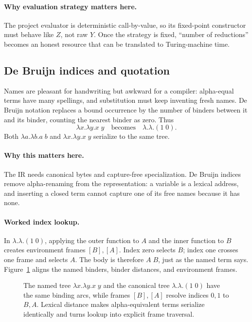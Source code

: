\paragraph{Why evaluation strategy matters here.}
The project evaluator is deterministic call-by-value, so its fixed-point
constructor must behave like \(Z\), not raw \(Y\).  Once the strategy is
fixed, ``number of reductions'' becomes an honest resource that can be
translated to Turing-machine time.

\subsection{De Bruijn indices and quotation}

Names are pleasant for handwriting but awkward for a compiler: alpha-equal
terms have many spellings, and substitution must keep inventing fresh names.
De Bruijn notation replaces a bound occurrence by the number of binders
between it and its binder, counting the nearest binder as zero.  Thus
\[
 \lambda x.\lambda y.x\;y
 \quad\text{becomes}\quad
 \lambda.\lambda.(1\;0).
\]
Both \(\lambda a.\lambda b.a\;b\) and
\(\lambda x.\lambda y.x\;y\) serialize to the same tree.

\paragraph{Why this matters here.}
The IR needs canonical bytes and capture-free specialization.  De Bruijn
indices remove alpha-renaming from the representation: a variable is a
lexical address, and inserting a closed term cannot capture one of its free
names because it has none.

\paragraph{Worked index lookup.}
In \(\lambda.\lambda.(1\;0)\), applying the outer function to \(A\) and the
inner function to \(B\) creates environment frames \([B],[A]\).  Index zero
selects \(B\); index one crosses one frame and selects \(A\).  The body is
therefore \(A\;B\), just as the named term says.
Figure~\ref{fig:de-bruijn} aligns the named binders, binder distances, and
environment frames.

\begin{figure}[t]
\centering

\caption{The named tree $\lambda x.\lambda y.x\;y$ and the canonical tree $\lambda.\lambda.(1\;0)$ have the same binding arcs, while frames $[B],[A]$ resolve indices $0,1$ to $B,A$.  Lexical distance makes alpha-equivalent terms serialize identically and turns lookup into explicit frame traversal.}
\label{fig:de-bruijn}
\end{figure}

